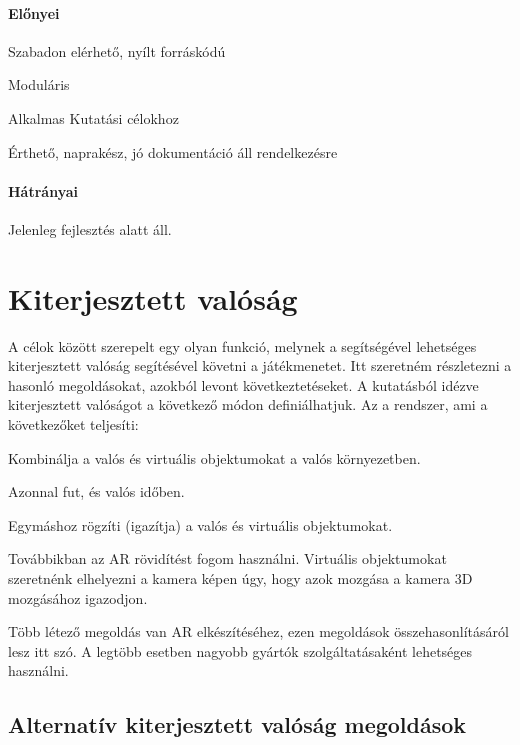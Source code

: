 \documentclass[12pt,a4paper,oneside]{report} %
\begin{document}
\paragraph{Előnyei} 
\begin{compactitem}
	\item Szabadon elérhető, nyílt forráskódú
	\item Moduláris
	\item Alkalmas Kutatási célokhoz
	\item Érthető, naprakész, jó dokumentáció áll rendelkezésre
\end{compactitem}
\paragraph{Hátrányai} 
\begin{compactitem}
	\item Jelenleg fejlesztés alatt áll.
\end{compactitem}


\section{Kiterjesztett valóság}
\label{kitvalo}
A célok között szerepelt egy olyan funkció, melynek a segítségével lehetséges kiterjesztett valóság segítésével követni a játékmenetet. Itt szeretném részletezni a hasonló megoldásokat, azokból levont következtetéseket.
A \cite{azuma2001recent} kutatásból idézve  kiterjesztett valóságot a következő módon definiálhatjuk. Az a rendszer, ami a következőket teljesíti:
\begin{compactitem}
	\item Kombinálja a valós és virtuális objektumokat a valós környezetben.
	\item Azonnal fut, és valós időben.
	\item Egymáshoz rögzíti (igazítja) a valós és virtuális objektumokat.
\end{compactitem}
Továbbikban az AR rövidítést fogom használni. 
Virtuális objektumokat szeretnénk elhelyezni a kamera képen úgy, hogy azok mozgása a kamera 3D mozgásához igazodjon. 
\par Több létező megoldás van AR elkészítéséhez, ezen megoldások összehasonlításáról lesz itt szó.
A legtöbb esetben nagyobb gyártók szolgáltatásaként lehetséges használni.
\subsection{Alternatív kiterjesztett valóság megoldások}
\end{document}
